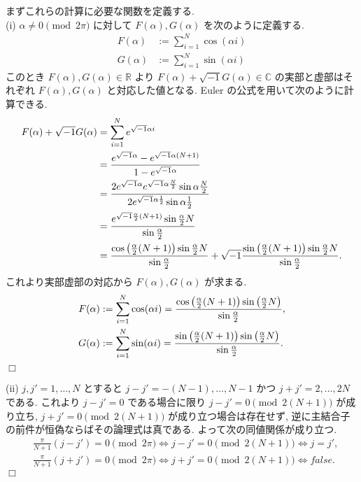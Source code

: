 \documentclass[a4paper,dvipdfmx]{jsarticle}
\theoremstyle{definition}
\newcommand{\RR}{\mathbb{R}}
\newcommand{\CC}{\mathbb{C}}
\begin{document}
まずこれらの計算に必要な関数を定義する. \\

(i) $\alpha \neq 0 \pmod{2\pi}$ に対して $F(\alpha), G(\alpha)$ を次のように定義する.
\begin{align}
  F(\alpha) & := \sum_{i=1}^{N}\cos(\alpha i) \\
  G(\alpha) & := \sum_{i=1}^{N}\sin(\alpha i)
\end{align}
このとき $F(\alpha), G(\alpha)\in\RR$ より $F(\alpha) + \sqrt{-1}G(\alpha)\in\CC$ の実部と虚部はそれぞれ $F(\alpha), G(\alpha)$ と対応した値となる. Euler の公式を用いて次のように計算できる.
\begin{align}
  F(\alpha) + \sqrt{-1}G(\alpha) & = \sum_{i=1}^{N}e^{\sqrt{-1}\alpha i}                                                                                                                                                     \\
                                 & = \frac{e^{\sqrt{-1}\alpha} - e^{\sqrt{-1}\alpha (N+1)}}{1 - e^{\sqrt{-1}\alpha}}                                                                                                         \\
                                 & = \frac{2e^{\sqrt{-1}\alpha}e^{\sqrt{-1}\alpha \frac{N}{2}}\sin{\alpha \frac{N}{2}}}{2e^{\sqrt{-1}\alpha\frac{1}{2}}\sin{\alpha\frac{1}{2}}}                                              \\
                                 & = \frac{e^{\sqrt{-1}\frac{\alpha}{2}(N+1)}\sin{\frac{\alpha}{2}N}}{\sin{\frac{\alpha}{2}}}                                                                                                \\
                                 & = \frac{\cos\qty(\frac{\alpha}{2}(N+1))\sin{\frac{\alpha}{2}N}}{\sin{\frac{\alpha}{2}}} + \sqrt{-1}\frac{\sin\qty(\frac{\alpha}{2}(N+1))\sin{\frac{\alpha}{2}N}}{\sin{\frac{\alpha}{2}}}.
\end{align}
これより実部虚部の対応から $F(\alpha), G(\alpha)$ が求まる.
\begin{align}
  F(\alpha) & := \sum_{i=1}^{N}\cos(\alpha i) = \frac{\cos\qty(\frac{\alpha}{2}(N+1))\sin\qty(\frac{\alpha}{2}N)}{\sin{\frac{\alpha}{2}}}, \\
  G(\alpha) & := \sum_{i=1}^{N}\sin(\alpha i) = \frac{\sin\qty(\frac{\alpha}{2}(N+1))\sin\qty(\frac{\alpha}{2}N)}{\sin{\frac{\alpha}{2}}}.
\end{align}
$\Box$

(ii) $j, j' = 1,\ldots,N$ とすると $j - j' = -(N - 1),\ldots,N - 1$ かつ $j + j' = 2,\ldots,2N$ である. これより $j - j' = 0$ である場合に限り $j - j' = 0 \pmod{2(N+1)}$ が成り立ち, $j + j' = 0 \pmod{2(N+1)}$ が成り立つ場合は存在せず, 逆に主結合子の前件が恒偽ならばその論理式は真である. よって次の同値関係が成り立つ.
\begin{align}
   & \frac{\pi}{N+1}(j - j') = 0 \pmod{2\pi} \iff j - j' = 0 \pmod{2(N+1)} \iff j = j', \label{Q17-3. ii-1} \\
   & \frac{\pi}{N+1}(j + j') = 0 \pmod{2\pi} \iff j + j' = 0 \pmod{2(N+1)} \iff false. \label{Q17-3. ii-2}
\end{align}
$\Box$
\end{document}
